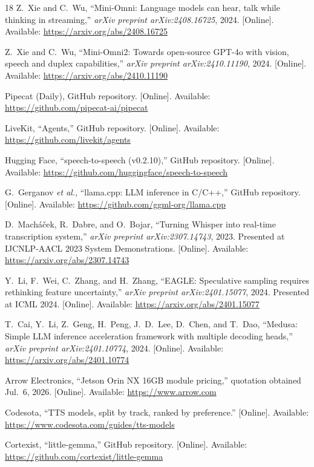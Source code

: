 \documentclass[journal]{IEEEtran}
\begin{document}
\begin{thebibliography}{18}
Z.~Xie and C.~Wu, ``Mini-Omni: Language models can hear, talk while thinking in streaming,'' \emph{arXiv preprint arXiv:2408.16725}, 2024. [Online]. Available: \url{https://arxiv.org/abs/2408.16725}

Z.~Xie and C.~Wu, ``Mini-Omni2: Towards open-source GPT-4o with vision, speech and duplex capabilities,'' \emph{arXiv preprint arXiv:2410.11190}, 2024. [Online]. Available: \url{https://arxiv.org/abs/2410.11190}

Pipecat (Daily), GitHub repository. [Online]. Available: \url{https://github.com/pipecat-ai/pipecat}

LiveKit, ``Agents,'' GitHub repository. [Online]. Available: \url{https://github.com/livekit/agents}

Hugging Face, ``speech-to-speech (v0.2.10),'' GitHub repository. [Online]. Available: \url{https://github.com/huggingface/speech-to-speech}

G.~Gerganov \emph{et al.}, ``llama.cpp: LLM inference in C/C++,'' GitHub repository. [Online]. Available: \url{https://github.com/ggml-org/llama.cpp}

D.~Macháček, R.~Dabre, and O.~Bojar, ``Turning Whisper into real-time transcription system,'' \emph{arXiv preprint arXiv:2307.14743}, 2023. Presented at IJCNLP-AACL 2023 System Demonstrations. [Online]. Available: \url{https://arxiv.org/abs/2307.14743}

Y.~Li, F.~Wei, C.~Zhang, and H.~Zhang, ``EAGLE: Speculative sampling requires rethinking feature uncertainty,'' \emph{arXiv preprint arXiv:2401.15077}, 2024. Presented at ICML 2024. [Online]. Available: \url{https://arxiv.org/abs/2401.15077}

T.~Cai, Y.~Li, Z.~Geng, H.~Peng, J.~D.~Lee, D.~Chen, and T.~Dao, ``Medusa: Simple LLM inference acceleration framework with multiple decoding heads,'' \emph{arXiv preprint arXiv:2401.10774}, 2024. [Online]. Available: \url{https://arxiv.org/abs/2401.10774}

Arrow Electronics, ``Jetson Orin NX 16GB module pricing,'' quotation obtained Jul.~6, 2026. [Online]. Available: \url{https://www.arrow.com}

Codesota, ``TTS models, split by track, ranked by preference.'' [Online]. Available: \url{https://www.codesota.com/guides/tts-models}

Cortexist, ``little-gemma,'' GitHub repository. [Online]. Available: \url{https://github.com/cortexist/little-gemma}

\end{thebibliography}
\end{document}
